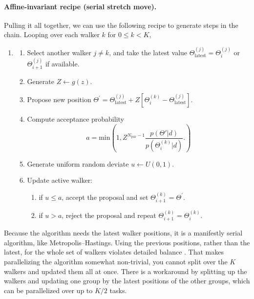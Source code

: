 \paragraph{Affine-invariant recipe (serial stretch move).}  Pulling it all together, we can use the following recipe to  generate steps in the chain.  Looping over each walker $k$ for $0 \leq k < K$,
\begin{enumerate}
\item[]
  \begin{enumerate}
  \item Select another walker $j \neq k$, and take the latest value $ \Theta^{(j)}_\mathrm{latest} = \Theta^{(j)}_{i}$ or  $\Theta^{(j)}_{i+1}$ if available.
  \item Generate $Z \leftarrow g(z)$. \label{affine_invariant_recipe_serial_start}
  \item Propose new position  $ \Theta^{\prime} =  \Theta^{(j)}_\mathrm{latest} + Z [  \Theta^{(k)}_{i}  -  \Theta^{(j)}_\mathrm{latest} ]$.
  \item Compute acceptance probability
    $$  a = \mathrm{min}\left( 1,Z^{N_\mathrm{par} - 1} \frac{p(\Theta'|d)}{p(\Theta^{(k)}_i|d)}.          \right) $$
  \item Generate uniform random deviate $u \leftarrow U(0,1)$.
  \item Update active walker:\label{affine_invariant_recipe_serial_end}
    \begin{enumerate}
    \item if $u \leq a$, accept the proposal and set $\Theta^{(k)}_{i+1} = \Theta^{\prime}$.
    \item if $u>a$, reject the proposal and repeat  $\Theta^{(k)}_{i+1} = \Theta^{(k)}_{i}$.
    \end{enumerate}
  \end{enumerate}
\end{enumerate}

Because the algorithm needs the latest walker positions, it is a manifestly serial algorithm, like Metropolis--Hastings.  Using the previous positions, rather than the latest, for the whole set of walkers violates detailed balance \citep{2013PASP..125..306F}.  That makes parallelizing the algorithm somewhat non-trivial, you cannot split over the $K$ walkers and updated them all at once.  There is a workaround by splitting up the walkers and updating one group by the latest positions of the other groups, which can be parallelized over up to $K/2$ tasks.

